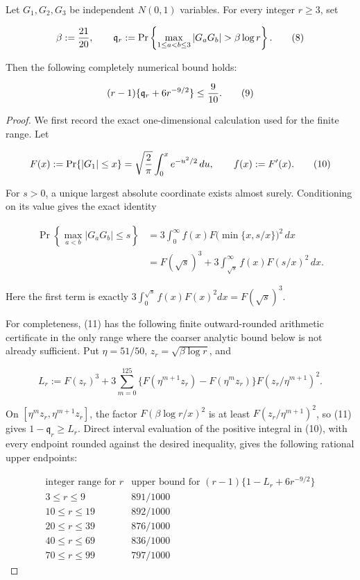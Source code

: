 \begin{lemma}\label{lem:step-002-product-reserve}
Let $G_1,G_2,G_3$ be independent $N(0,1)$ variables. For every integer
$r\ge3$, set

\[
\beta:={21\over20},\qquad
\mathfrak q_r:=\Pr\left\{
\max_{1\le a<b\le3}|G_aG_b|>\beta\log r\right\}.
\tag{8}
\]

Then the following completely numerical bound holds:

\[
(r-1)\{\mathfrak q_r+6r^{-9/2}\}\le {9\over10}.
\tag{9}
\]

\begin{proof}
We first record the exact one-dimensional calculation used for the finite
range. Let

\[
F(x):=\Pr\{|G_1|\le x\}
=\sqrt{2\over\pi}\int_0^x e^{-u^2/2}\,du,
\qquad f(x):=F'(x).
\tag{10}
\]

For $s>0$, a unique largest absolute coordinate exists almost surely.
Conditioning on its value gives the exact identity

\[
\begin{aligned}
\Pr\left\{\max_{a<b}|G_aG_b|\le s\right\}
&=3\int_0^\infty f(x)
 F\bigl(\min\{x,s/x\}\bigr)^2\,dx\\
&=F(\sqrt s)^3
+3\int_{\sqrt s}^\infty f(x)F(s/x)^2\,dx.
\end{aligned}
\tag{11}
\]

Here the first term is exactly
$3\int_0^{\sqrt s}f(x)F(x)^2dx=F(\sqrt s)^3$.

For completeness, (11) has the following finite outward-rounded arithmetic
certificate in the only range where the coarser analytic bound below is not
already sufficient. Put $\eta=51/50$, $z_r=\sqrt{\beta\log r}$, and

\[
L_r:=F(z_r)^3+3\sum_{m=0}^{125}
 \{F(\eta^{m+1}z_r)-F(\eta^m z_r)\}
 F(z_r/\eta^{m+1})^2.
\tag{12}
\]

On $[\eta^mz_r,\eta^{m+1}z_r]$, the factor
$F(\beta\log r/x)^2$ is at least
$F(z_r/\eta^{m+1})^2$, so (11) gives
$1-\mathfrak q_r\ge L_r$. Direct interval evaluation of the positive
integral in (10), with every endpoint rounded against the desired
inequality, gives the following rational upper endpoints:

\[
\begin{array}{c|c}
\text{integer range for }r
  &\text{upper bound for }(r-1)\{1-L_r+6r^{-9/2}\}\\ \hline
3\le r\le9   &891/1000\\
10\le r\le19 &892/1000\\
20\le r\le39 &876/1000\\
40\le r\le69 &836/1000\\
70\le r\le99 &797/1000
\end{array}
\]


\end{proof}
\end{lemma}
